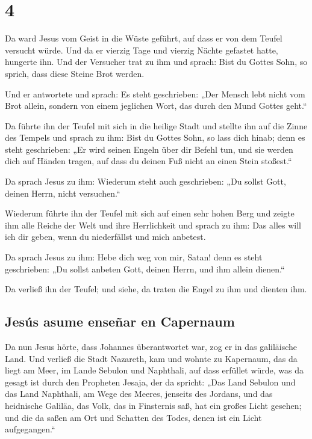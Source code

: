 \hypertarget{section-3}{%
\section{4}\label{section-3}}

 Da ward Jesus vom Geist in die Wüste geführt, auf dass er
von dem Teufel versucht würde.  Und da er vierzig Tage und
vierzig Nächte gefastet hatte, hungerte ihn.  Und der
Versucher trat zu ihm und sprach: Bist du Gottes Sohn, so sprich, dass
diese Steine Brot werden.

 Und er antwortete und sprach: Es steht geschrieben: „Der
Mensch lebt nicht vom Brot allein, sondern von einem jeglichen Wort, das
durch den Mund Gottes geht.``

 Da führte ihn der Teufel mit sich in die heilige Stadt
und stellte ihn auf die Zinne des Tempels  und sprach zu
ihm: Bist du Gottes Sohn, so lass dich hinab; denn es steht geschrieben:
„Er wird seinen Engeln über dir Befehl tun, und sie werden dich auf
Händen tragen, auf dass du deinen Fuß nicht an einen Stein stoßest.``

 Da sprach Jesus zu ihm: Wiederum steht auch geschrieben:
„Du sollst Gott, deinen Herrn, nicht versuchen.``

 Wiederum führte ihn der Teufel mit sich auf einen sehr
hohen Berg und zeigte ihm alle Reiche der Welt und ihre Herrlichkeit
 und sprach zu ihm: Das alles will ich dir geben, wenn du
niederfällst und mich anbetest.

 Da sprach Jesus zu ihm: Hebe dich weg von mir, Satan!
denn es steht geschrieben: „Du sollst anbeten Gott, deinen Herrn, und
ihm allein dienen.``

 Da verließ ihn der Teufel; und siehe, da traten die
Engel zu ihm und dienten ihm.

\hypertarget{jesuxfas-asume-enseuxf1ar-en-capernaum}{%
\subsection{Jesús asume enseñar en
Capernaum}\label{jesuxfas-asume-enseuxf1ar-en-capernaum}}

 Da nun Jesus hörte, dass Johannes überantwortet war, zog
er in das galiläische Land.  Und verließ die Stadt
Nazareth, kam und wohnte zu Kapernaum, das da liegt am Meer, im Lande
Sebulon und Naphthali,  auf dass erfüllet würde, was da
gesagt ist durch den Propheten Jesaja, der da spricht: 
„Das Land Sebulon und das Land Naphthali, am Wege des Meeres, jenseits
des Jordans, und das heidnische Galiläa,  das Volk, das
in Finsternis saß, hat ein großes Licht gesehen; und die da saßen am Ort
und Schatten des Todes, denen ist ein Licht aufgegangen.``

